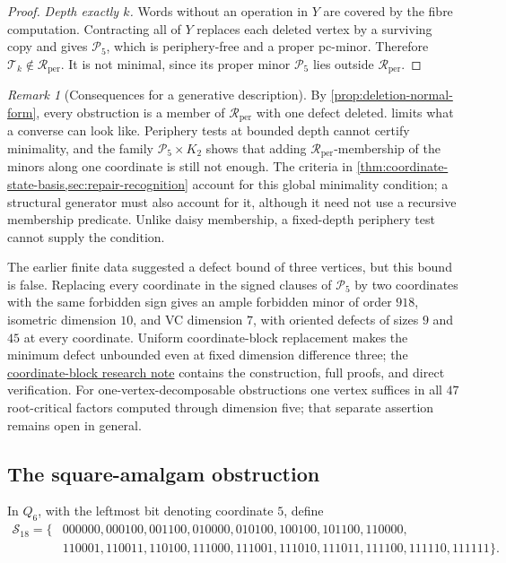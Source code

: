 \documentclass[11pt]{article}
\theoremstyle{definition}
\theoremstyle{remark}
\newtheorem{remark}[theorem]{Remark}
\newcommand{\Rper}{\mathcal R_{\mathrm{per}}}
\begin{document}
\begin{proof}
\emph{Depth exactly \(k\).}  Words without an operation in \(Y\) are
covered by the fibre computation.  Contracting all of \(Y\) replaces each
deleted vertex by a surviving copy and gives \(\mathcal P_5\), which is
periphery-free and a proper pc-minor.  Therefore
\(\mathcal T_k\notin\Rper\).  It is not minimal, since its proper minor
\(\mathcal P_5\) lies outside \(\Rper\).
\end{proof}

\begin{remark}[Consequences for a generative description]
\label{rem:no-local-generator}
By \cref{prop:deletion-normal-form}, every obstruction is a member of
\(\Rper\) with one defect deleted.   limits
what a converse can look like.  Periphery tests at bounded depth cannot
certify minimality, and the family \(\mathcal P_5\times K_2\) shows that
adding \(\Rper\)-membership of the minors along one coordinate is still not
enough.  The criteria in \cref{thm:coordinate-state-basis,sec:repair-recognition}
account for this global minimality condition; a structural generator must
also account for it, although it need not use a recursive membership
predicate.  Unlike daisy membership, a fixed-depth periphery test cannot
supply the condition.

The earlier finite data suggested a defect bound of three vertices, but
this bound is false.  Replacing every coordinate in the signed clauses
of \(\mathcal P_5\) by two coordinates with the same forbidden sign gives
an ample forbidden minor of order \(918\), isometric dimension \(10\),
and VC dimension \(7\), with oriented defects of sizes \(9\) and \(45\)
at every coordinate.  Uniform coordinate-block replacement makes the
minimum defect unbounded even at fixed dimension difference three;
the \href{../minor-atlas/research/coordinate_block_amplification.pdf}{coordinate-block research note}
contains the construction, full proofs, and direct verification.
For one-vertex-decomposable obstructions one vertex suffices in all
\(47\) root-critical factors computed through dimension five; that
separate assertion remains open in general.
\end{remark}

\subsection{The square-amalgam obstruction}

In \(Q_6\), with the leftmost bit denoting coordinate \(5\), define
\begin{equation}
\begin{split}
 \mathcal S_{18}=\{&
 000000,000100,001100,010000,010100,100100,101100,110000,\\
 &110001,110011,110100,111000,111001,111010,111011,111100,
 111110,111111\}.
\end{split}
\label{eq:S18}
\end{equation}
\end{document}
